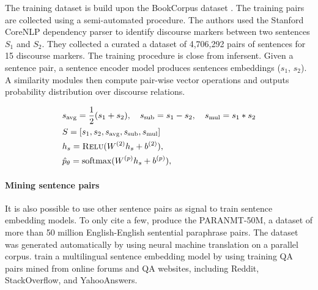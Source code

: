 The training dataset is build upon the BookCorpus dataset \parencite{zhu_15}. The training pairs are collected using a semi-automated procedure. The authors used the Stanford CoreNLP dependency parser \parencite{schuster_16} to identify discourse markers between two sentences $S_1$ and $S_2$. They collected a curated a dataset of 4,706,292 pairs of sentences for 15 discourse markers. The training procedure is close from infersent. Given a sentence pair, a sentence encoder model produces sentences embeddings ($s_1$, $s_2$). A similarity modules then compute pair-wise vector operations and outputs probability distribution over discourse relations.

\begin{equation}
\begin{split}
    &s_{\text{avg}} = \frac{1}{2} (s_1 + s_2), ~~~s_{\text{sub}} = s_1 - s_2, ~~~s_{\text{mul}} = s_1 * s_2 \\
    &S = [s_1, s_2, s_{\text{avg}}, s_{\text{sub}}, s_{\text{mul}}]\\
    &h_s = \textsc{Relu}(W^{(2)}h_s + b^{(2)}), \\
    &\hat{p}_{\theta} = \text{softmax}(W^{(p)}h_s + b^{(p)}),\\
\end{split}
\label{eq:vec_op}
\end{equation}

\paragraph{Mining sentence pairs} 

It is also possible to use other sentence pairs as signal to train sentence embedding models. To only cite a few, \textcite{gimpel_18} produce the PARANMT-50M, a dataset of more than 50 million English-English sentential paraphrase pairs. The dataset was generated automatically by using neural machine translation on a parallel corpus. \textcite{yang_20} train a multilingual sentence embedding model by using training QA pairs mined from online forums and QA websites, including Reddit, StackOverflow, and YahooAnswers.


